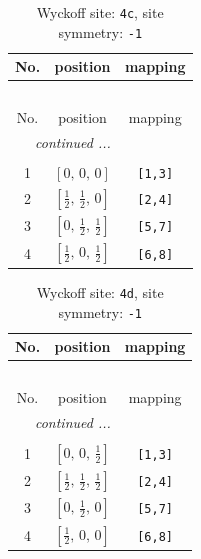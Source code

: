 \documentclass[fleqn,8pt]{jsarticle}
\begin{document}
\renewcommand{\arraystretch}{1.2}
\begin{longtable}{ccc}
\caption{Wyckoff site: {\tt 4c}, site symmetry: {\tt -1}}
 \\
 \hline \hline
No. & position & mapping \\ \hline \endfirsthead

\multicolumn{2}{l}{\tablename\ \thetable{}} \\
 \hline \hline
No. & position & mapping \\ \hline \endhead

 \hline \hline
\multicolumn{2}{r}{\footnotesize\it continued ...} \\ \endfoot

 \hline \hline
\multicolumn{2}{r}{} \\ \endlastfoot

1 & $\left[ 0,\, 0,\, 0 \right]$ & {\tt [1,3]} \\ \hline
2 & $\left[ \frac{1}{2},\, \frac{1}{2},\, 0 \right]$ & {\tt [2,4]} \\ \hline
3 & $\left[ 0,\, \frac{1}{2},\, \frac{1}{2} \right]$ & {\tt [5,7]} \\ \hline
4 & $\left[ \frac{1}{2},\, 0,\, \frac{1}{2} \right]$ & {\tt [6,8]} \\
\end{longtable}
\renewcommand{\arraystretch}{1.2}
\begin{longtable}{ccc}
\caption{Wyckoff site: {\tt 4d}, site symmetry: {\tt -1}}
 \\
 \hline \hline
No. & position & mapping \\ \hline \endfirsthead

\multicolumn{2}{l}{\tablename\ \thetable{}} \\
 \hline \hline
No. & position & mapping \\ \hline \endhead

 \hline \hline
\multicolumn{2}{r}{\footnotesize\it continued ...} \\ \endfoot

 \hline \hline
\multicolumn{2}{r}{} \\ \endlastfoot

1 & $\left[ 0,\, 0,\, \frac{1}{2} \right]$ & {\tt [1,3]} \\ \hline
2 & $\left[ \frac{1}{2},\, \frac{1}{2},\, \frac{1}{2} \right]$ & {\tt [2,4]} \\ \hline
3 & $\left[ 0,\, \frac{1}{2},\, 0 \right]$ & {\tt [5,7]} \\ \hline
4 & $\left[ \frac{1}{2},\, 0,\, 0 \right]$ & {\tt [6,8]} \\
\end{longtable}
\end{document}

